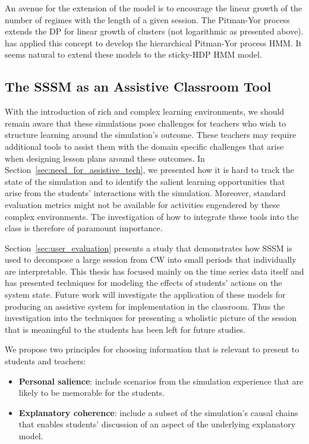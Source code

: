 An avenue for the extension of the \cite{fox2009nonparametric} model is to encourage the linear growth of the number of regimes with the length of a given session. The Pitman-Yor process~\citep{pitman1997two} extends the DP for linear growth of clusters (not logarithmic as presented above). \cite{blunsom2011hierarchical} has applied this concept to develop the hierarchical Pitman-Yor process HMM. It seems natural to extend these models to the \cite{fox2007hierarchical,fox2009nonparametric} sticky-HDP HMM model.

\subsection{The SSSM as an Assistive Classroom Tool}\label{sec:class-assistive}
With the introduction of rich and complex learning environments, we should remain aware that these simulations pose challenges for teachers who wish to structure learning around the simulation's outcome. These teachers may require additional tools to assist them with the domain specific challenges that arise when designing lesson plans around these outcomes. In Section~\ref{sec:need_for_assistive_tech}, we presented how it is hard to track the state of the simulation and to identify the salient learning opportunities that arise from the students' interactions with the simulation. Moreover, standard evaluation metrics might not be available for activities engendered by these complex environments. The investigation of how to integrate these tools into the class is therefore of paramount importance.

Section~\ref{sec:user_evaluation} presents a study that demonstrates how SSSM is used to decompose a large session from CW into small periods that individually are interpretable. This thesis has focused mainly on the time series data itself and has presented techniques for modeling the effects of students' actions on the system state. Future work will investigate the application of these models for producing an assistive system for implementation in the classroom. Thus the investigation into the techniques for presenting a wholistic picture of the session that is meaningful to the students has been left for future studies.

We propose two principles for choosing information that is relevant to present to students and teachers:
\begin{itemize}
  \item \textbf{Personal salience}: include scenarios from the simulation experience that are likely to be memorable for the students.
  \item \textbf{Explanatory coherence}: include a subset of the simulation’s causal chains that enables students’ discussion of an aspect of the underlying explanatory model.
\end{itemize}

